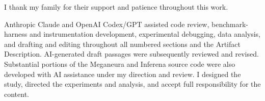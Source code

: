 \documentclass[conference]{IEEEtran}
\newcommand{\system}{Meganeura}
\newcommand{\inferena}{Inferena}
\begin{document}
I thank my family for their support and patience throughout this work.

Anthropic Claude and OpenAI Codex/GPT
\cite{anthropic2026claude,openai2026codex} assisted code review,
benchmark-harness and instrumentation development, experimental debugging,
data analysis, and drafting and editing throughout all numbered sections and
the Artifact Description.
AI-generated draft passages were subsequently reviewed and revised.
Substantial portions of the \system{} and \inferena{} source code were also
developed with AI assistance under my direction and review. I designed the
study, directed the experiments and analysis, and accept full responsibility
for the content.




\clearpage
\setcounter{section}{0}
\setcounter{subsection}{0}
\renewcommand{\theHsection}{AD.\arabic{section}}
\hypersetup{hidelinks}

\end{document}
